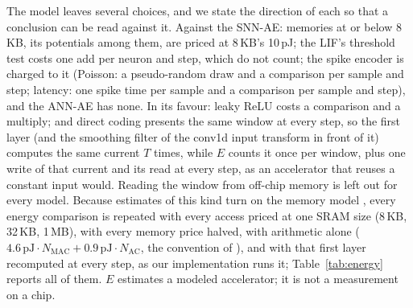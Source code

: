 \documentclass[conference]{IEEEtran}
\begin{document}
\par The model leaves several choices, and we state the direction of each so that a conclusion
can be read against it. Against the SNN-AE: memories at or below 8\,KB, its potentials among
them, are priced at 8\,KB's 10\,pJ; the LIF's threshold test costs one add per neuron and step,
which \cite{lemaire2022analytical} do not count; the spike encoder is charged to it (Poisson:
a pseudo-random draw and a comparison per sample and step; latency: one spike time per
sample and a comparison per sample and step), and the ANN-AE has none. In its favour: leaky
ReLU costs a comparison and a multiply; and direct coding presents the same window at every
step, so the first layer (and the smoothing filter of the conv1d input transform in front of
it) computes the same current $T$ times, while $E$ counts it once per window, plus one write of
that current and its read at every step, as an accelerator that reuses a constant input would.
Reading the window from off-chip memory is left out for every model.
Because estimates of this kind turn on the memory model \cite{dampfhoffer2023snns,yan2024reconsidering},
every energy comparison is repeated with every access priced at one SRAM size (8\,KB, 32\,KB,
1\,MB), with every memory price halved, with arithmetic alone ($4.6\,\mathrm{pJ}\cdot N_{\mathrm{MAC}} +
0.9\,\mathrm{pJ}\cdot N_{\mathrm{AC}}$, the convention of \cite{zhou2023spikformer}), and with
that first layer recomputed at every step, as our implementation runs it;
Table~\ref{tab:energy} reports all of them. $E$ estimates a modeled accelerator; it is not a
measurement on a chip.
\end{document}
